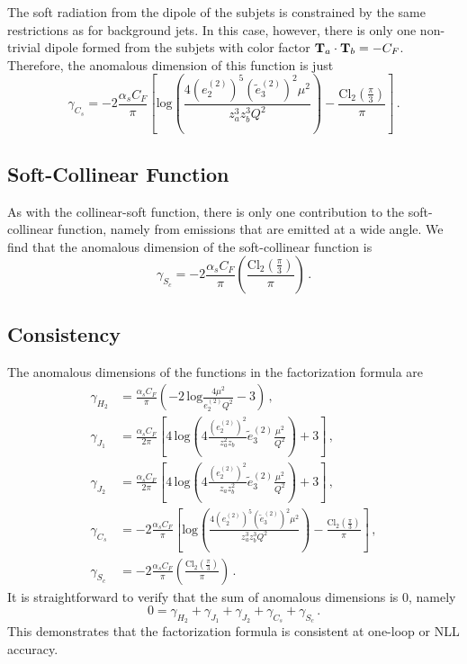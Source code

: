 \documentclass[a4paper,11pt]{article}
\newcommand{\ecf}[2]{e_{#1}^{(#2)}}
\newcommand{\ecflp}[2]{\tilde e_{#1}^{(#2)}}
\def\log{\text{log}}
\begin{document}
The soft radiation from the dipole of the subjets is constrained by the same restrictions as for background jets.  In this case, however, there is only one non-trivial dipole formed from the subjets with color factor ${\bf T}_a\cdot {\bf T}_b = -C_F$.  Therefore, the anomalous dimension of this function is just
\begin{equation}
\gamma_{C_s} = -2\frac{\alpha_s C_F}{\pi} \left[
\log \left( \frac{4(\ecf{2}{2})^5(\ecflp{3}{2})^2\mu^2}{z_a^3z_b^3Q^2} \right)-\frac{\text{Cl}_2(\frac{\pi}{3})}{\pi}
\right]\,.
\end{equation}

\subsection{Soft-Collinear Function}

As with the collinear-soft function, there is only one contribution to the soft-collinear function, namely from emissions that are emitted at a wide angle. We find that the anomalous dimension of the soft-collinear function is
\begin{equation}
\gamma_{S_c}=-2\frac{\alpha_s C_F}{\pi} \left(\frac{\text{Cl}_2(\frac{\pi}{3})}{\pi} \right)\,.
\end{equation}



\subsection{Consistency}

The anomalous dimensions of the functions in the factorization formula are
\begin{align}
\gamma_{H_2} &= \frac{\alpha_sC_F}{\pi}\left(
-2\,\log\frac{4\mu^2}{\ecf{2}{2}Q^2}-3
\right)\,,\\
\gamma_{J_1}& = \frac{\alpha_s C_F}{2\pi}\left[
4\,  \log\left( 4\frac{\left(\ecf{2}{2}\right)^2}{z_a^2z_b}\ecflp{3}{2}\frac{\mu^2}{Q^2}  \right)+3
\right]\,,\\
\gamma_{J_2} &= \frac{\alpha_s C_F}{2\pi}\left[
4\,  \log\left( 4\frac{\left(\ecf{2}{2}\right)^2}{z_az_b^2}\ecflp{3}{2}\frac{\mu^2}{Q^2}  \right)+3
\right]\,,\\
\gamma_{C_s} &= -2\frac{\alpha_s C_F}{\pi} \left[
\log \left( \frac{4(\ecf{2}{2})^5(\ecflp{3}{2})^2\mu^2}{z_a^3z_b^3Q^2} \right)-\frac{\text{Cl}_2(\frac{\pi}{3})}{\pi}
\right]\,,\\
\gamma_{S_c}&=-2\frac{\alpha_s C_F}{\pi}\left(\frac{\text{Cl}_2(\frac{\pi}{3})}{\pi}\right)\,.
\end{align}
It is straightforward to verify that the sum of anomalous dimensions is $0$, namely
\begin{equation}
0=\gamma_{H_2}+\gamma_{J_1}+\gamma_{J_2}+\gamma_{C_s}+\gamma_{S_c}\,.
\end{equation}
This demonstrates that the factorization formula is consistent at one-loop or NLL accuracy.
\end{document}
